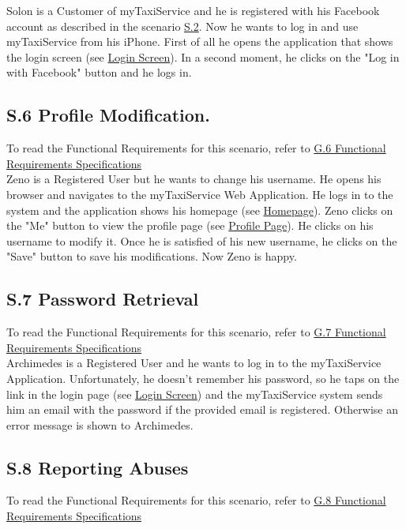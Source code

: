 		\label{sec:CustomerFacebookLoginScenario}
		Solon is a Customer of myTaxiService and he is registered with his Facebook account as described in the scenario \hyperref[sec:FacebookCustomerRegistrationScenario]{S.2}. Now he wants to log in and use myTaxiService from his iPhone.
		First of all he opens the application that shows the login screen (see \hyperref[login_m]{Login Screen}). In a second moment, he clicks on the "Log in with Facebook" button and he logs in.

		\subsection{S.6 Profile Modification.}\label{sec:RegisteredUserProfileModificationScenario}
		To read the Functional Requirements for this scenario, refer to \hyperref[sec:frs6]{G.6 Functional Requirements Specifications}\\

		Zeno is a Registered User but he wants to change his username. He opens his browser and navigates to the myTaxiService Web Application. He logs in to the system and the application shows his homepage (see \hyperref[chome_m]{Homepage}). Zeno clicks on the "Me" button to view the profile page (see \hyperref[cpersonalPage_m]{Profile Page}). He clicks on his username to modify it. Once he is satisfied of his new username, he clicks on the "Save" button to save his modifications. Now Zeno is happy.

		\subsection{S.7 Password Retrieval}\label{sec:PasswordRetrievalScenario}
		To read the Functional Requirements for this scenario, refer to \hyperref[sec:frs7]{G.7 Functional Requirements Specifications}\\

		Archimedes is a Registered User and he wants to log in to the myTaxiService Application. Unfortunately, he doesn't remember his password, so he taps on the link in the login page (see \hyperref[login_m]{Login Screen}) and the myTaxiService system sends him an email with the password if the provided email is registered. Otherwise an error message is shown to Archimedes.

		\subsection{S.8 Reporting Abuses}\label{sec:ReportingAbusesScenario}
		To read the Functional Requirements for this scenario, refer to \hyperref[sec:frs8]{G.8 Functional Requirements Specifications}\\

